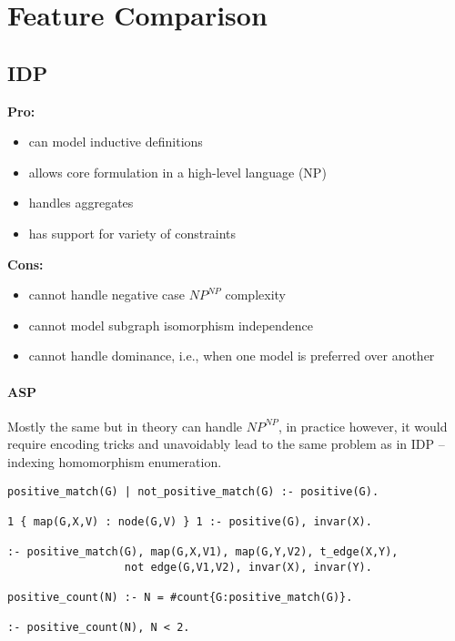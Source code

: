 \documentclass{article}
\theoremstyle{definition}
\begin{document}
\section{Feature Comparison}

\subsection{IDP} 

\textbf{Pro:}
\begin{itemize}
  \item can model inductive definitions
  \item allows core formulation in a high-level language (NP)
  \item handles aggregates
  \item has support for variety of constraints
\end{itemize}
\textbf{Cons:}
\begin{itemize}
  \item cannot handle negative case $\textit{NP}^\textit{NP}$ complexity
  \item cannot model subgraph isomorphism independence
  \item cannot handle dominance, i.e., when one model is preferred over another 
\end{itemize}

\paragraph{ASP}
Mostly the same but in theory can handle $\textit{NP}^\textit{NP}$, in practice however, it would require encoding tricks and unavoidably lead to the same problem as in IDP -- indexing homomorphism enumeration.

\lstset{basicstyle=\footnotesize\ttfamily,breaklines=true}
\begin{lstlisting}[caption=ASP positive matching]
positive_match(G) | not_positive_match(G) :- positive(G).

1 { map(G,X,V) : node(G,V) } 1 :- positive(G), invar(X).

:- positive_match(G), map(G,X,V1), map(G,Y,V2), t_edge(X,Y), 
                  not edge(G,V1,V2), invar(X), invar(Y).

positive_count(N) :- N = #count{G:positive_match(G)}.

:- positive_count(N), N < 2.
\end{lstlisting}
\end{document}
